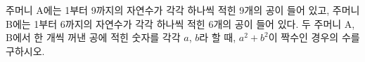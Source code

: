 주머니 A에는 1부터 9까지의 자연수가 각각 하나씩 적힌 9개의 공이 들어 있고, 주머니 B에는 1부터 6까지의 자연수가 각각 하나씩 적힌 6개의 공이 들어 있다. 두 주머니 A, B에서 한 개씩 꺼낸 공에 적힌 숫자를 각각 $a$, $b$라 할 때, $a^2+b^2$이 짝수인 경우의 수를 구하시오.
